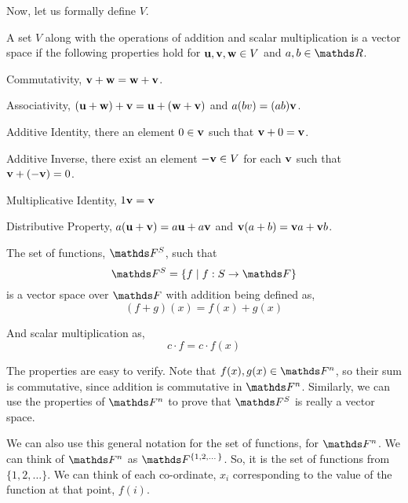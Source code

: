 Now, let us formally define \(V\). 

\begin{definition}
    A set \(V\) along with the operations of addition and scalar multiplication is a vector
    space if the following properties hold for \(\boldsymbol{\mathbf{u}}, \boldsymbol{\mathbf{v}}, \boldsymbol{\mathbf{w}} \in V\) and \(a, b \in \RR\).

    \begin{axioms}
        \item Commutativity, \(\boldsymbol{\mathbf{v}} + \boldsymbol{\mathbf{w}} = \boldsymbol{\mathbf{w}} + \boldsymbol{\mathbf{v}}\).
        \item Associativity, \((\boldsymbol{\mathbf{u}} + \boldsymbol{\mathbf{w}}) + \boldsymbol{\mathbf{v}} = \boldsymbol{\mathbf{u}} + (\boldsymbol{\mathbf{w}} + \boldsymbol{\mathbf{v}})\) and \(a(bv) = (ab)\boldsymbol{\mathbf{v}}\).
        \item Additive Identity, there an element \(0 \in \boldsymbol{\mathbf{v}}\) such that \(\boldsymbol{\mathbf{v}} + 0 = \boldsymbol{\mathbf{v}}\).
        \item Additive Inverse, there exist an element \(-\boldsymbol{\mathbf{v}} \in V\) for each \(\boldsymbol{\mathbf{v}}\) such that 
        \(\boldsymbol{\mathbf{v}} + (-\boldsymbol{\mathbf{v}}) = 0\).
        \item Multiplicative Identity, \(1\boldsymbol{\mathbf{v}} = \boldsymbol{\mathbf{v}}\)
        \item Distributive Property, \(a(\boldsymbol{\mathbf{u}} + \boldsymbol{\mathbf{v}}) = a\boldsymbol{\mathbf{u}} + a\boldsymbol{\mathbf{v}}\) and \(\boldsymbol{\mathbf{v}}(a + b) = \boldsymbol{\mathbf{v}} a + \boldsymbol{\mathbf{v}} b\). 
    \end{axioms}

\end{definition}

\begin{example}
    The set of functions, \(\FF^S\), such that \[ \FF^S = \{ f \given f : S \to \FF\}\]
    is a vector space over \(\FF\) with addition being defined as, 
    \begin{equation*}
    (f + g)(x) = f(x) + g(x)
    \end{equation*}

    And scalar multiplication as, 
    \begin{equation*}
        c \cdot f = c \cdot f(x)
    \end{equation*}

    The properties are easy to verify. Note that \(f(x), g(x) \in \FF^n\), so their sum is commutative, since 
    addition is commutative in \(\FF^n\). Similarly, we can use the properties of \(\FF^n\) to 
    prove that \(\FF^S\) is really a vector space.
\end{example}

We can also use this general notation for the set of functions, for \(\FF^n\). 
We can think of \(\FF^n\) as \(\FF^{\{1, 2, \dots\}}\). So, it is the set of functions 
from \(\{1, 2, \dots\}\). We can think of each co-ordinate, \(x_i\) corresponding to 
the value of the function at that point, \(f(i)\).

